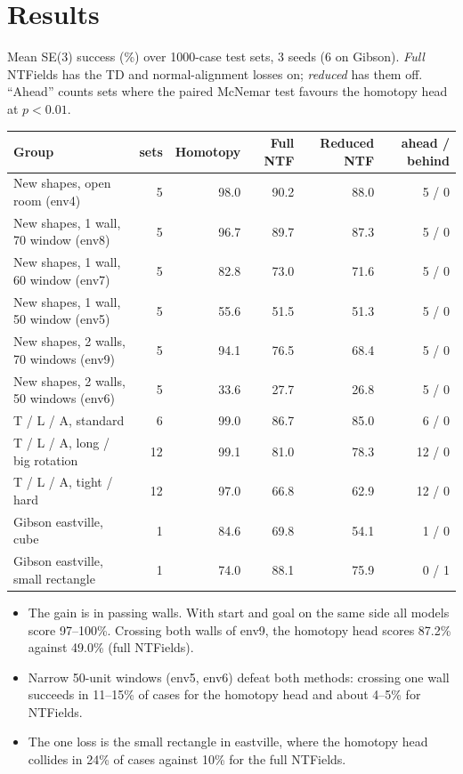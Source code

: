 \documentclass[10pt]{article}
\begin{document}
\section{Results}
Mean SE(3) success (\%) over 1000-case test sets, 3 seeds (6 on Gibson). \emph{Full} NTFields has the TD and
normal-alignment losses on; \emph{reduced} has them off. ``Ahead'' counts sets where the paired McNemar test favours the
homotopy head at $p<0.01$.

\begin{center}\small
\begin{tabular}{lrrrrr}
\toprule
Group & sets & Homotopy & Full NTF & Reduced NTF & ahead / behind \\
\midrule
New shapes, open room (env4)        & 5  & 98.0 & 90.2 & 88.0 & 5 / 0 \\
New shapes, 1 wall, 70 window (env8)& 5  & 96.7 & 89.7 & 87.3 & 5 / 0 \\
New shapes, 1 wall, 60 window (env7)& 5  & 82.8 & 73.0 & 71.6 & 5 / 0 \\
New shapes, 1 wall, 50 window (env5)& 5  & 55.6 & 51.5 & 51.3 & 5 / 0 \\
New shapes, 2 walls, 70 windows (env9)& 5 & 94.1 & 76.5 & 68.4 & 5 / 0 \\
New shapes, 2 walls, 50 windows (env6)& 5 & 33.6 & 27.7 & 26.8 & 5 / 0 \\
T / L / A, standard                 & 6  & 99.0 & 86.7 & 85.0 & 6 / 0 \\
T / L / A, long / big rotation      & 12 & 99.1 & 81.0 & 78.3 & 12 / 0 \\
T / L / A, tight / hard             & 12 & 97.0 & 66.8 & 62.9 & 12 / 0 \\
\midrule
Gibson eastville, cube              & 1  & 84.6 & 69.8 & 54.1 & 1 / 0 \\
Gibson eastville, small rectangle   & 1  & 74.0 & 88.1 & 75.9 & 0 / 1 \\
\bottomrule
\end{tabular}
\end{center}

\begin{itemize}\setlength\itemsep{1pt}
  \item The gain is in passing walls. With start and goal on the same side all models score 97--100\%. Crossing both
        walls of env9, the homotopy head scores 87.2\% against 49.0\% (full NTFields).
  \item Narrow 50-unit windows (env5, env6) defeat both methods: crossing one wall succeeds in 11--15\% of cases for the
        homotopy head and about 4--5\% for NTFields.
  \item The one loss is the small rectangle in eastville, where the homotopy head collides in 24\% of cases against
        10\% for the full NTFields.
\end{itemize}
\end{document}
